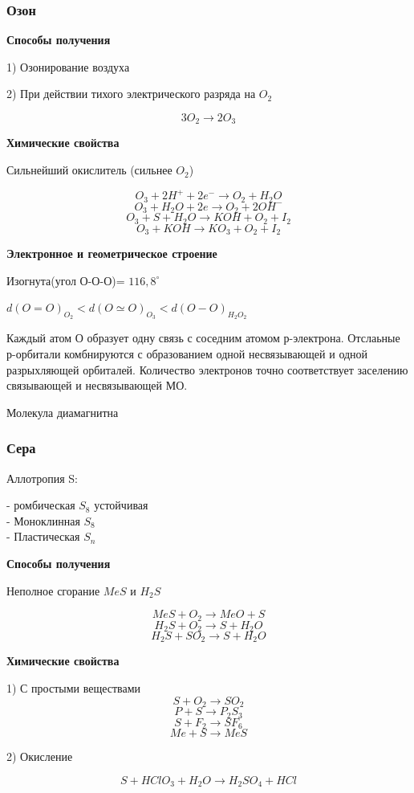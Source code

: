 \subsubsection*{Озон}

\textbf{Способы получения}

1) Озонирование воздуха

2) При действии тихого электрического разряда на $O_2$

$$3O_2 \rightarrow 2O_3$$

\textbf{Химические свойства}

Сильнейший окислитель (сильнее $O_2$)

$$O_3 + 2H^+ + 2e^- \rightarrow O_2 + H_2O$$
$$O_3 + H_2O + 2e \rightarrow O_2 + 2OH^-$$
$$O_3 + S + H_2O \rightarrow KOH + O_2 + I_2$$
$$O_3 + KOH \rightarrow KO_3 + O_2 + I_2$$

\textbf{Электронное и геометрическое строение}

Изогнута(угол О-О-О)= $116,8^{\circ}$

$d(O=O)_{O_2}< d(O\simeq O)_{O_3}<d(O-O)_{H_2O_2}$

Каждый атом О образует одну связь с соседним атомом р-электрона. Отслаьные р-орбитали комбнируются с образованием одной несвязывающей и одной разрыхляющей орбиталей. Количество электронов точно соответствует заселению связывающей и несвязывающей МО.

Молекула диамагнитна

\subsubsection*{Сера}

Аллотропия S:

- ромбическая $S_8$ устойчивая\\
- Моноклинная $S_8$\\
- Пластическая $S_n$

\textbf{Способы получения}

Неполное сгорание $MeS$ и $H_2S$

$$MeS + O_2 \rightarrow MeO + S$$
$$H_2S + O_2 \rightarrow S + H_2O$$
$$H_2S + SO_2 \rightarrow S+ H_2O$$

\textbf{Химические свойства}

1) С простыми веществами
$$S + O_2 \rightarrow SO_2$$
$$P + S \rightarrow P_2S_3$$
$$S+F_2 \rightarrow SF_6$$
$$Me + S \rightarrow MeS$$

2) Окисление

$$S + HClO_3 + H_2O \rightarrow H_2SO_4 + HCl$$

